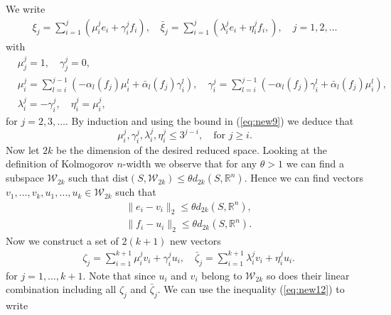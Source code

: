 We write
\begin{equation} \label{eq:new10}
\begin{aligned}
	\xi_j = \sum_{i=1}^j \left( \mu_i^j e_i + \gamma_i^j f_i \right), \quad \bar{\xi}_j = \sum_{i=1}^j \left( \lambda_i^j e_i + \eta_i^j f_i,  \right), \quad j=1,2,\dots
\end{aligned}
\end{equation}
with
\begin{equation} \label{eq:new11}
\begin{aligned}
	&\mu^j_j = 1, \quad \gamma^j_j = 0, \\
	&\mu_i^j = \sum_{l=i}^{j-1}\left( - \alpha_l(f_j) \mu_i^l  + \bar{\alpha}_l(f_j) \gamma_i^l \right), \quad\gamma_i^j = \sum_{l=i}^{j-1}\left( - \alpha_l(f_j) \gamma_i^l  + \bar{\alpha}_l(f_j) \mu_i^l \right), \\
	&\lambda^j_i = - \gamma ^j_i, \quad \eta^j_i = \mu^j_i,
\end{aligned}
\end{equation}
for $j=2,3,\dots$. By induction and using the bound in (\ref{eq:new9}) we deduce that
\begin{equation} \label{eq:new12}
	\mu^j_i,\gamma^j_i,\lambda^j_i,\eta^j_i \leq 3^{j-i}, \quad \text{for } j\geq i.
\end{equation}
Now let $2k$ be the dimension of the desired reduced space. Looking at the definition of Kolmogorov $n$-width we observe that for any $\theta > 1$ we can find a subspace $\mathcal W_{2k}$ such that $\text{dist}(S,\mathcal W _{2k}) \leq \theta d_{2k}(S,\mathbb R^n)$. Hence we can find vectors $v_1,\dots,v_k,u_1,\dots,u_k\in \mathcal W_{2k}$ such that
\begin{equation} \label{eq:new13}
\begin{aligned}
	& \|e_i - v_i\|_2 \leq \theta d_{2k}(S,\mathbb R^n), \\
	& \|f_i - u_i\|_2 \leq \theta d_{2k}(S,\mathbb R^n).
\end{aligned}
\end{equation}
Now we construct a set of $2(k+1)$ new vectors
\begin{equation} \label{eq:new14}
\begin{aligned}
	& \zeta_j = \sum_{i=1}^{k+1} \mu_i^j v_i + \gamma^j_i u_i,\quad \bar{\zeta}_j = \sum_{i=1}^{k+1} \lambda_i^j v_i + \eta^j_i u_i.
\end{aligned}
\end{equation}
for $j = 1,\dots,k+1$. Note that since $u_i$ and $v_i$ belong to $\mathcal W_{2k}$ so does their linear combination including all $\zeta_j$ and $\bar{\zeta}_j$. We can use the inequality (\ref{eq:new12}) to write
